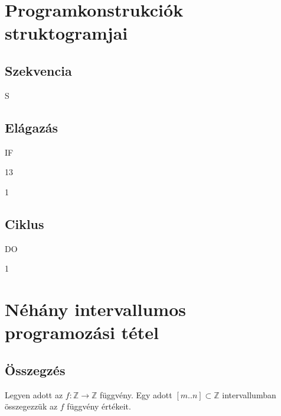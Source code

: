 \documentclass[a4paper,12pt]{article}
\begin{document}
	\author{Zsolt Borsi}	
\bigskip
\bigskip

\section{Programkonstrukciók struktogramjai}
\subsection{Szekvencia}
\begin{stuki*}[3cm]{S}
\end{stuki*}
\smallskip

\subsection{Elágazás}
\begin{stuki*}[3cm]{IF}
\begin{CASE}{1}{3}
    \WHEN*{\stm{\cdots}}
      \stm{\cdots}
\end{CASE}
\end{stuki*}
\bigskip

\begin{stuki}[3cm]
\begin{IF}{1}{\stm{\pi}}
   \ELSE
\end{IF}
\end{stuki}
\smallskip

\subsection{Ciklus}
\begin{stuki*}[3cm]{DO}
\begin{WHILE}{1}{\stm{\pi}}
\end{WHILE}
\end{stuki*}
\newpage


\section{Néhány intervallumos programozási tétel}

\subsection{Összegzés}
Legyen adott az $f\colon \mathbb{Z}\rightarrow\mathbb{Z}$ függvény. Egy adott $[m..n]\subset \mathbb{Z}$ intervallumban összegezzük az $f$ függvény értékeit.\\
\end{document}
